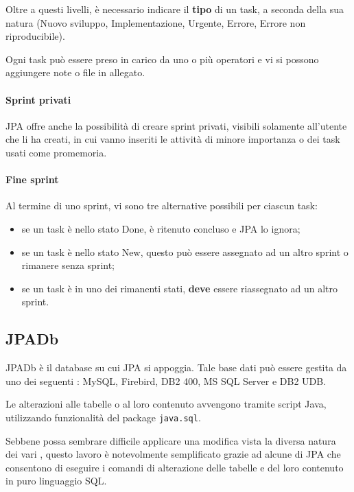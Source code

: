 Oltre a questi livelli, è necessario indicare il \textbf{tipo} di un task, a
seconda della sua natura (Nuovo sviluppo, Implementazione, Urgente, Errore,
Errore non riproducibile).

Ogni task può essere preso in carico da uno o più operatori e vi si possono
aggiungere note o file in allegato.

\paragraph{Sprint privati} \mbox{}

JPA offre anche la possibilità di creare sprint privati, visibili solamente
all'utente che li ha creati, in cui vanno inseriti le attività di minore
importanza o dei task usati come promemoria.

\paragraph{Fine sprint} \mbox{}

Al termine di uno sprint, vi sono tre alternative possibili per ciascun task:

\begin{itemize}
	\item se un task è nello stato Done, è ritenuto concluso e JPA lo ignora;
	\item se un task è nello stato New, questo può essere assegnato ad un altro
	sprint o rimanere senza sprint;
	\item se un task è in uno dei rimanenti stati, \textbf{deve} essere
	riassegnato ad un altro sprint.
\end{itemize}

\subsection{JPADb}

JPADb è il database su cui JPA si appoggia. Tale base dati può essere gestita
da uno dei seguenti : MySQL, Firebird, DB2 400, MS SQL Server e DB2
UDB.

Le alterazioni alle tabelle o al loro contenuto avvengono tramite script Java,
utilizzando funzionalità del package \texttt{java.sql}.

Sebbene possa sembrare difficile applicare una modifica vista la diversa natura
dei vari , questo lavoro è notevolmente semplificato grazie ad
alcune  di JPA che consentono di eseguire i comandi di alterazione
delle tabelle e del loro contenuto in puro linguaggio SQL.

